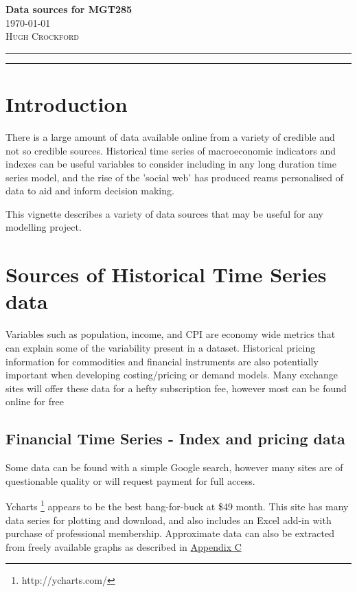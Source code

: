 \documentclass[11pt]{article}
\begin{document}
\begin{flushleft}
	\vspace*{0.3in}
	\Huge \textbf{Data sources for MGT285}\\
	\Large \today \\
	\vspace{0.25in}
	\textsc{Hugh Crockford}
	\vspace{0.25in}
	\hrule
	\hrule
	\tableofcontents
\end{flushleft}

	\vspace{0.75in}

\newpage
\section{Introduction}
	There is a large amount of data available online from a variety of credible and not so credible sources.
	Historical time series of macroeconomic indicators and indexes can be useful variables to consider including in any long duration time series model, and the rise of the 'social web' has produced reams personalised of data to aid and inform decision making.


	This vignette describes a variety of data sources that may be useful for any modelling project.

\section{Sources of Historical Time Series data}
	Variables such as population, income, and CPI are economy wide metrics that can explain some of the variability present in a dataset.
	Historical pricing information for commodities and financial instruments are also potentially important when developing costing/pricing or demand models.
	Many exchange sites will offer these data for a hefty subscription fee, however most can be found online for free

	\subsection{Financial Time Series - Index and pricing data}
	Some data can be found with a simple Google search, however many sites are of questionable quality or will request payment for full access.


	Ycharts \footnote{http://ycharts.com/} appears to be the best bang-for-buck at \$49 month. 
	This site has many data series for plotting and download, and also includes an Excel add-in with purchase of professional membership.
	Approximate data can also be extracted from freely available graphs as described in \hyperref[graph]{Appendix C}
\end{document}

